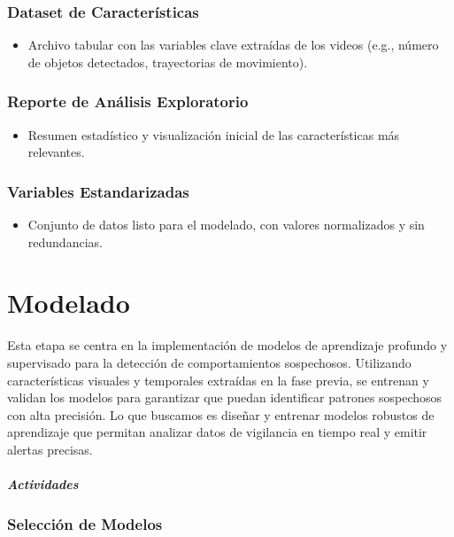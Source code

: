 \documentclass[listof=nochaptergap,12pt,times,authoryear]{report}
\begin{document}
\subsubsection{Dataset de Características}
\begin{itemize}
    \item Archivo tabular con las variables clave extraídas de los videos (e.g., número de objetos detectados, trayectorias de movimiento).
\end{itemize}

\subsubsection{Reporte de Análisis Exploratorio}
\begin{itemize}
    \item Resumen estadístico y visualización inicial de las características más relevantes.
\end{itemize}

\subsubsection{Variables Estandarizadas}
\begin{itemize}
    \item Conjunto de datos listo para el modelado, con valores normalizados y sin redundancias.
\end{itemize}


\section{Modelado}
Esta etapa se centra en la implementación de modelos de aprendizaje profundo y supervisado para la detección de comportamientos sospechosos. Utilizando características visuales y temporales extraídas en la fase previa, se entrenan y validan los modelos para garantizar que puedan identificar patrones sospechosos con alta precisión.
Lo que buscamos es diseñar y entrenar modelos robustos de aprendizaje que permitan analizar datos de vigilancia en tiempo real y emitir alertas precisas.


\paragraph{\textit{Actividades}}

\subsubsection{Selección de Modelos}
\end{document}
